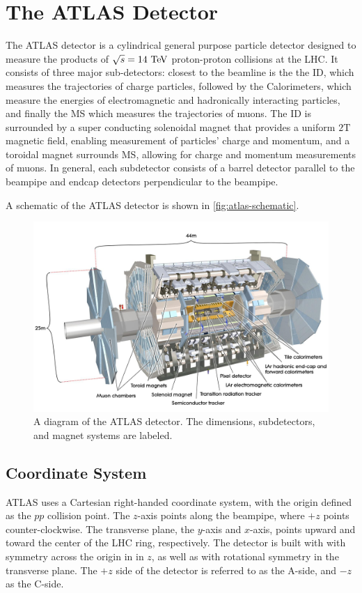 \chapter{The ATLAS Detector}

The \ac{ATLAS} detector is a cylindrical general purpose particle detector designed to measure the products of $\sqrt{s} = 14 \TeV$ proton-proton collisions at the \ac{LHC}. It consists of three major sub-detectors: closest to the beamline is the the \ac{ID}, which measures the trajectories of charge particles, followed by the Calorimeters, which measure the energies of electromagnetic and hadronically interacting particles, and finally the \ac{MS} which measures the trajectories of muons. The \ac{ID} is surrounded by a super conducting solenoidal magnet that provides a uniform $2\textrm{T}$ magnetic field, enabling measurement of particles' charge and momentum, and a toroidal magnet surrounds \ac{MS}, allowing for charge and momentum measurements of muons. In general, each subdetector consists of a barrel detector parallel to the beampipe and endcap detectors perpendicular to the beampipe.

A schematic of the \ac{ATLAS} detector is shown in \autoref{fig:atlas-schematic}.


\begin{figure}[htbp]
\centering
\includegraphics[width=.8\textwidth]{figures/Detector/atlas-schematic.jpg}
\caption{A diagram of the \ac{ATLAS} detector. The dimensions, subdetectors, and magnet systems are labeled. }
\label{fig:atlas-schematic}
\end{figure}

\section{Coordinate System}
\ac{ATLAS} uses a Cartesian right-handed coordinate system, with the origin defined as the $pp$ collision point. The $z$-axis points along the beampipe, where $+z$ points counter-clockwise. The transverse plane, the $y$-axis and $x$-axis, points upward and toward the center of the \ac{LHC} ring, respectively. The detector is built with with symmetry across the origin in in $z$, as well as with rotational symmetry in the transverse plane. The $+z$ side of the detector is referred to as the A-side, and $-z$ as the C-side.

